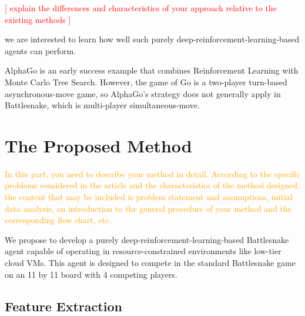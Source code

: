 \documentclass[conference]{IEEEtran}
\newcommand{\todo}[1]{\textcolor{red}{[ #1 ]}}
\newcommand{\instruction}[1]{\textcolor{orange}{#1}}
\begin{document}
\todo{explain the differences and characteristics of your approach relative to
    the existing methods
}

we are interested to learn how well such purely
deep-reinforcement-learning-based agents can perform.

AlphaGo is an early success example that combines Reinforcement Learning with Monte Carlo Tree Search.
However, the game of Go is a two-player turn-based asynchronous-move game,
so AlphaGo's strategy does not generally apply in Battlesnake,
which is multi-player simultaneous-move.

\section{The Proposed Method}

\instruction{In this part, you need to describe your method in detail.
    According to the specific problems considered in the article and the
    characteristics of the method designed,
    the content that may be included is problem statement and assumptions,
    initial data analysis,
    an introduction to the general procedure of your method and the
    corresponding flow chart, etc.
}

We propose to develop a purely deep-reinforcement-learning-based Battlesnake
agent capable of operating in resource-constrained environments like low-tier
cloud VMs.
This agent is designed to compete in the standard Battlesnake game on an 11 by
11 board with 4 competing players.

\subsection{Feature Extraction}
\end{document}
